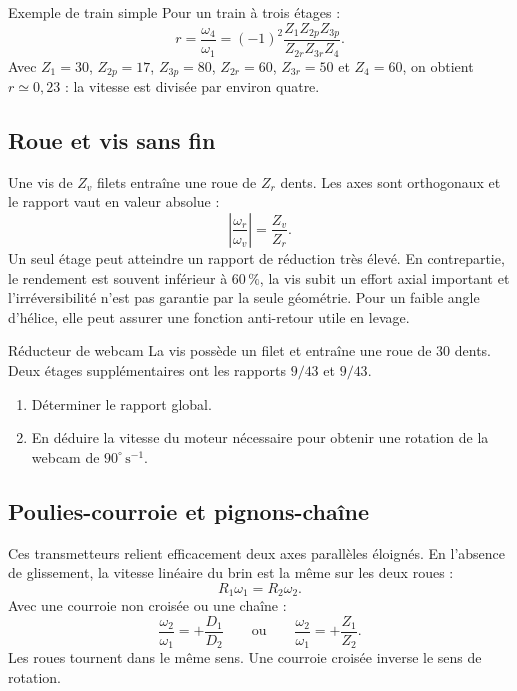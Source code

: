 \begin{TLThreeApp}{Exemple de train simple}
Pour un train à trois étages :
\[
r=\frac{\omega_4}{\omega_1}
=(-1)^2\frac{Z_1Z_{2p}Z_{3p}}{Z_{2r}Z_{3r}Z_4}.
\]
Avec $Z_1=30$, $Z_{2p}=17$, $Z_{3p}=80$,
$Z_{2r}=60$, $Z_{3r}=50$ et $Z_4=60$, on obtient
$r\simeq0{,}23$ : la vitesse est divisée par environ quatre.
\end{TLThreeApp}

\subsection{Roue et vis sans fin}

Une vis de $Z_v$ filets entraîne une roue de $Z_r$ dents. Les axes sont
orthogonaux et le rapport vaut en valeur absolue :
\[
\boxed{\left|\frac{\omega_r}{\omega_v}\right|=\frac{Z_v}{Z_r}.}
\]
Un seul étage peut atteindre un rapport de réduction très élevé. En
contrepartie, le rendement est souvent inférieur à $60\,\%$, la vis
subit un effort axial important et l'irréversibilité n'est pas garantie
par la seule géométrie. Pour un faible angle d'hélice, elle peut assurer
une fonction anti-retour utile en levage.

\begin{TLThreeApp}{Réducteur de webcam}
La vis possède un filet et entraîne une roue de $30$ dents. Deux étages
supplémentaires ont les rapports $9/43$ et $9/43$.
\begin{enumerate}
  \item Déterminer le rapport global.
  \item En déduire la vitesse du moteur nécessaire pour obtenir une rotation de la webcam de $90^\circ\,\mathrm{s^{-1}}$.
\end{enumerate}
\end{TLThreeApp}

\subsection{Poulies-courroie et pignons-chaîne}

Ces transmetteurs relient efficacement deux axes parallèles éloignés.
En l'absence de glissement, la vitesse linéaire du brin est la même sur
les deux roues :
\[
R_1\omega_1=R_2\omega_2.
\]
Avec une courroie non croisée ou une chaîne :
\[
\boxed{\frac{\omega_2}{\omega_1}=+\frac{D_1}{D_2}}
\qquad\text{ou}\qquad
\boxed{\frac{\omega_2}{\omega_1}=+\frac{Z_1}{Z_2}.}
\]
Les roues tournent dans le même sens. Une courroie croisée inverse le
sens de rotation.
